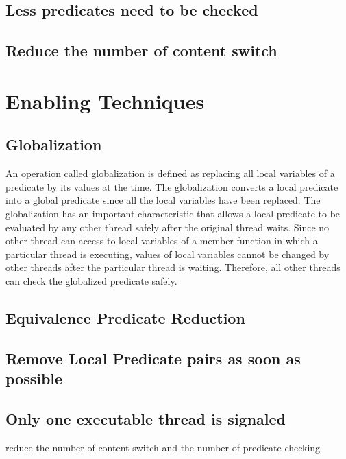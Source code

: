 \documentclass[10pt, conference, compsocconf]{IEEEtran}
\begin{document}
\subsection{Less predicates need to be checked}
\subsection{Reduce the number of content switch}

\section{Enabling Techniques}

\subsection{Globalization}
An operation called globalization is defined as replacing all local variables of
a predicate by its values at the time. The globalization converts a local 
predicate into a global predicate since all the local variables have been 
replaced. The globalization has an important characteristic that allows a
local predicate to be evaluated by any other thread safely after the original
thread waits. Since no other thread can access to local variables of a member 
function in which a particular thread is executing, values of local variables 
cannot be changed by other threads after the particular thread is waiting. 
Therefore, all other threads can check the globalized predicate safely. 


\subsection{Equivalence Predicate Reduction}

\subsection{Remove Local Predicate pairs as soon as possible}

\subsection{Only one executable thread is signaled}
reduce the number of content switch and the number of predicate checking 
\end{document}
